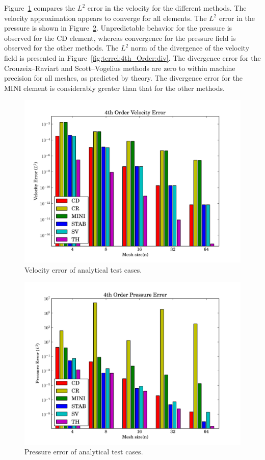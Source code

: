 Figure~\ref{fig:terrel:4th_Order:vel} compares the $L^{2}$ error in the
velocity for the different methods. The velocity approximation appears
to converge for all elements.  The $L^{2}$ error in the pressure is
shown in Figure~\ref{fig:terrel:4th_Order:press}.  Unpredictable
behavior for the pressure is observed for the CD element, whereas
convergence for the pressure field is observed for the other methods.
The $L^{2}$ norm of the divergence of the velocity field is presented
in Figure~\ref{fig:terrel:4th_Order:div}.  The divergence error for the
Crouzeix--Raviart and Scott--Vogelius methods are zero to within machine
precision for all meshes, as predicted by theory. The divergence error for
the MINI element is considerably greater than that for the other methods.

\begin{figure}
  \center\includegraphics[width=\largefig]{chapters/terrel/pdf/vel_4.pdf}
  \caption{Velocity error of analytical test cases.}
  \label{fig:terrel:4th_Order:vel}
\end{figure}

\begin{figure}
  \center \includegraphics[width=\largefig]{chapters/terrel/pdf/press_4.pdf}
  \caption{Pressure error of analytical test cases.}
  \label{fig:terrel:4th_Order:press}
\end{figure}

